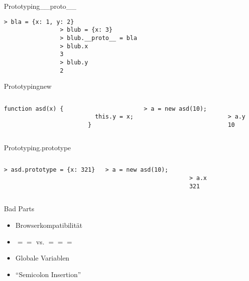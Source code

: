 \documentclass{beamer}
\begin{document}
		\begin{frame}[fragile,shrink=5]{Prototyping}{\_\_proto\_\_}
			\begin{lstlisting}[]
				> bla = {x: 1, y: 2}
				> blub = {x: 3}
				> blub.__proto__ = bla
				> blub.x
				3
				> blub.y
				2
			\end{lstlisting}
		\end{frame}
		
		\begin{frame}[fragile,shrink=5]{Prototyping}{new}
			\begin{columns}
					\begin{lstlisting}[]
						function asd(x) {
						  this.y = x;
						}
					\end{lstlisting}
				
					\begin{lstlisting}[]
						> a = new asd(10);
						> a.y
						10
					\end{lstlisting}
			\end{columns}
		\end{frame}

		\begin{frame}[fragile,shrink=5]{Prototyping}{.prototype}
			\begin{columns}
				\column{.50\textwidth}
					\begin{lstlisting}[title={}]
						> asd.prototype = {x: 321}
					\end{lstlisting}
				
				\column{.50\textwidth}
					\begin{lstlisting}[title={}]
						> a = new asd(10);
						> a.x
						321
					\end{lstlisting}
			\end{columns}
		\end{frame}

		\begin{frame}[fragile,shrink=5]{Bad Parts}{}
			\begin{itemize}
				\item Browserkompatibilität
				\item $==$ vs. $===$
				\item Globale Variablen
				\item "`Semicolon Insertion"'
			\end{itemize}
		\end{frame}
\end{document}
